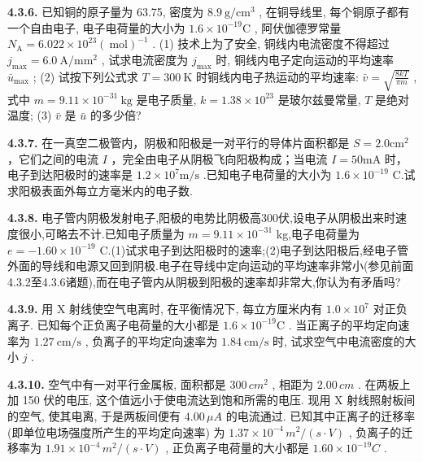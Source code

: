 \vfill
\newpage

\textbf{4.3.6.} 已知铜的原子量为 63.75, 密度为 $8.9 \mathrm{~g} / \mathrm{cm}^{3}$ , 在铜导线里, 每个铜原子都有一个自由电子, 电子电荷量的大小为 $1.6 \times 10^{-19} \mathrm{C}$ , 阿伏伽德罗常量 $N_{\mathrm{A}} = 6.022 \times 10^{23} (\mathrm{~mol})^{-1}$ . (1) 技术上为了安全, 铜线内电流密度不得超过 $j_{\max} = 6.0 \mathrm{~A} / \mathrm{mm}^{2}$ , 试求电流密度为 $j_{\max}$ 时, 铜线内电子定向运动的平均速率 $\bar{u}_{\max}$ ; (2) 试按下列公式求 $T = 300 \mathrm{~K}$ 时铜线内电子热运动的平均速率: $\displaystyle \bar{v} = \sqrt{\frac{8 k T}{\pi m}}$ , 式中 $m = 9.11 \times 10^{-31} \mathrm{~kg}$ 是电子质量, $k = 1.38 \times 10^{23}$ 是玻尔兹曼常量, $T$ 是绝对温度; (3) $\bar{v}$ 是 $\bar{u}$ 的多少倍?

\vfill
\newpage

\textbf{4.3.7.} 在一真空二极管内，阴极和阳极是一对平行的导体片面积都是 $S = 2.0\mathrm{cm}^2$ ，它们之间的电流 $I$ ，完全由电子从阴极飞向阳极构成；当电流 $I = 50\mathrm{mA}$ 时，电子到达阳极时的速率是 $1.2\times 10^{7}\mathrm{m / s}$ .已知电子电荷量的大小为 $1.6\times 10^{-19}$ C.试求阳极表面外每立方毫米内的电子数.

\vfill
\newpage

\textbf{4.3.8.} 电子管内阴极发射电子,阳极的电势比阴极高300伏,设电子从阴极出来时速度很小,可略去不计.已知电子质量为 $m=9.11\times10^{-31}$ kg,电子电荷量为 $e=-1.60\times10^{-19}$ C.(1)试求电子到达阳极时的速率;(2)电子到达阳极后,经电子管外面的导线和电源又回到阴极.电子在导线中定向运动的平均速率非常小(参见前面4.3.2至4.3.6诸题),而在电子管内从阴极到阳极的速率却非常大,你认为有矛盾吗?

\vfill
\newpage

\textbf{4.3.9.} 用 X 射线使空气电离时, 在平衡情况下, 每立方厘米内有 $1.0 \times 10^{7}$ 对正负离子. 已知每个正负离子电荷量的大小都是 $1.6 \times 10^{-19} \mathrm{C}$ . 当正离子的平均定向速率为 $1.27 \mathrm{~cm} / \mathrm{s}$ , 负离子的平均定向速率为 $1.84 \mathrm{~cm} / \mathrm{s}$ 时, 试求空气中电流密度的大小 $j$ .

\vfill
\newpage

\textbf{4.3.10.} 空气中有一对平行金属板, 面积都是 $300 \, cm^{2}$ , 相距为 $2.00 \, cm$ . 在两板上加 150 伏的电压, 这个值远小于使电流达到饱和所需的电压. 现用 X 射线照射板间的空气, 使其电离, 于是两板间便有 $4.00 \, \mu A$ 的电流通过. 已知其中正离子的迁移率 (即单位电场强度所产生的平均定向速率) 为 $1.37 \times 10^{-4} \, m^{2}/(s \cdot V)$ , 负离子的迁移率为 $1.91 \times 10^{-4} \, m^{2}/(s \cdot V)$ , 正负离子电荷量的大小都是 $1.60 \times 10^{-19} C$ .

